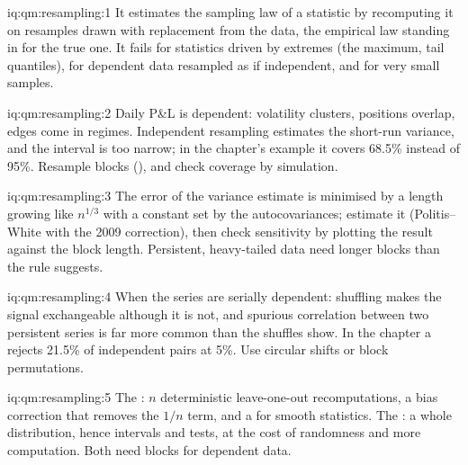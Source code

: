 \begin{solution}{iq:qm:resampling:1}
It estimates the sampling law of a statistic by recomputing it on resamples drawn with replacement from the data, the empirical law standing
in for the true one. It fails for statistics driven by extremes (the maximum, tail quantiles), for dependent data resampled as if
independent, and for very small samples.
\end{solution}

\begin{solution}{iq:qm:resampling:2}
Daily P\&L is dependent: volatility clusters, positions overlap, edges come in regimes. Independent resampling estimates the short-run variance,
and the interval is too narrow; in the chapter's example it covers 68.5\% instead of 95\%. Resample blocks (), and check
coverage by simulation.
\end{solution}

\begin{solution}{iq:qm:resampling:3}
The error of the variance estimate is minimised by a length growing like $n^{1/3}$ with a constant set by the autocovariances; estimate
it (Politis--White with the 2009 correction), then check sensitivity by plotting the result against the block length. Persistent,
heavy-tailed data need longer blocks than the rule suggests.
\end{solution}

\begin{solution}{iq:qm:resampling:4}
When the series are serially dependent: shuffling makes the signal exchangeable although it is not, and spurious correlation between two
persistent series is far more common than the shuffles show. In the chapter a  rejects 21.5\% of independent pairs at
5\%. Use circular shifts or block permutations.
\end{solution}

\begin{solution}{iq:qm:resampling:5}
The : $n$ deterministic leave-one-out recomputations, a bias correction that removes the $1/n$ term, and a  for smooth
statistics. The : a whole distribution, hence intervals and tests, at the cost of randomness and more computation. Both need
blocks for dependent data.
\end{solution}

